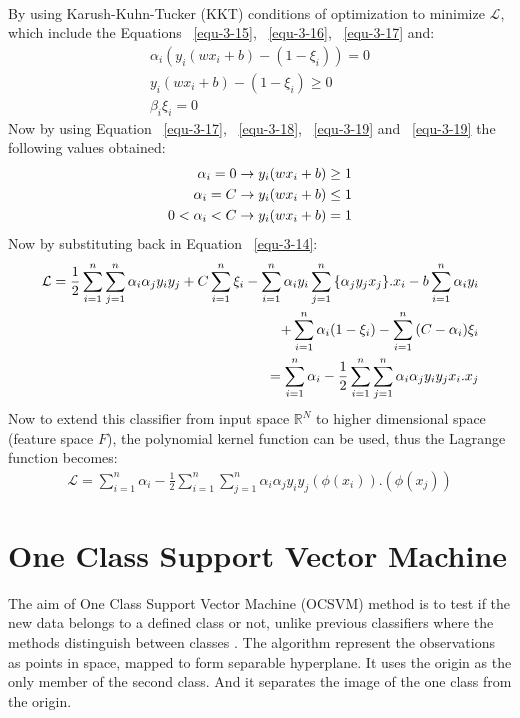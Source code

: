 \begin{itemize}
\begin{align}
\end{align}
By using Karush-Kuhn-Tucker (KKT) conditions of optimization to minimize $\mathcal{L}$, which include the Equations ~\ref{equ-3-15}, ~\ref{equ-3-16}, ~\ref{equ-3-17} and:
\begin{align}
\label{equ-3-18}
\alpha_i (y_i (w x_i +b) - (1-\xi_i)) = 0 \\
\label{equ-3-19}
y_i(w x_i +b) - (1-\xi_i) \geq 0 \\
\label{equ-3-20}
\beta_i \xi_i = 0
\end{align}
Now by using Equation ~\ref{equ-3-17}, ~\ref{equ-3-18}, ~\ref{equ-3-19} and ~\ref{equ-3-19} the following values obtained:
\begin{align}
\notag
\alpha_i = 0 \rightarrow y_i(w x_i+b) \geq 1 \\
\notag
\alpha_i = C \rightarrow y_i(w x_i+b) \leq 1 \\
\notag
0<\alpha_i<C \rightarrow y_i(w x_i+b)=1 \notag
\end{align}
Now by substituting back in Equation ~\ref{equ-3-14}:
\begin{align}
\label{equ-3-21}
\mathcal{L} = \frac{1}{2}\sum_{i=1}^{n}\sum_{j=1}^{n} \alpha_i \alpha_j y_i y_j + C \sum_{i=1}^{n}{\xi_i} - \sum_{i=1}^{n}{\alpha_i y_i} \sum_{j=1}^{n}{\lbrace \alpha_j y_j x_j \rbrace}.x_i - b \sum_{i=1}^{n}{\alpha_i y_i} \\ + \sum_{i=1}^{n}{\alpha_i (1-\xi_i)} - \sum_{i=1}^{n}{(C-\alpha_i)\xi_i}\notag
\\
\label{equ-3-22}
= \sum_{i=1}^{n} \alpha_i - \frac{1}{2} \sum_{i=1}^{n}\sum_{j=1}^{n}{\alpha_i \alpha_j y_i y_j x_i. x_j}
\end{align}
Now to extend this classifier from input space $\mathbb{R}^N$ to higher dimensional space (feature space $F$), the polynomial kernel function can be used, thus the Lagrange function becomes:
\begin{align}
\label{equ-3-23}
\mathcal{L} = \sum_{i=1}^{n} \alpha_i - \frac{1}{2}\sum_{i=1}^{n}\sum_{j=1}^{n}{\alpha_i \alpha_j y_i y_j (\phi(x_i)). (\phi(x_j))}
\end{align}
\end{itemize}
\section{One Class Support Vector Machine} \label{OCSVM}
The aim of  One Class Support Vector Machine (OCSVM) method is to test if the new data belongs to a defined class or not, unlike previous classifiers where the methods distinguish between classes \citep{Roemer}. The algorithm represent the observations as points in space, mapped to form separable hyperplane. It uses the origin as the only member of the second class. And it separates the image of the one class from the origin. %

